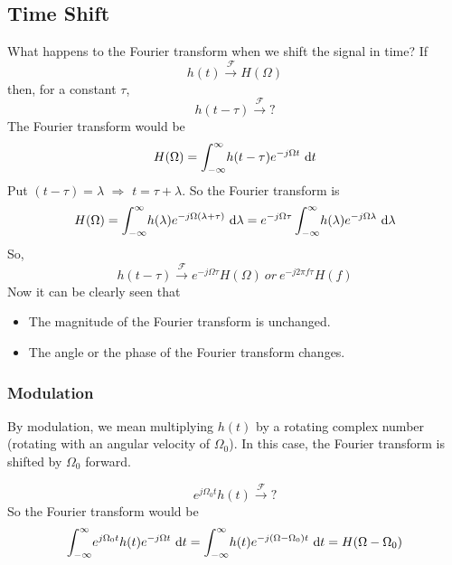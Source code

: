 \subsection{Time Shift}
	What happens to the Fourier transform when we shift the signal in time? If
	\begin{equation}
		h(t) \xrightarrow{\mathcal{F}} H(\Omega)
	\end{equation}
	then, for a constant $\tau$,
	\begin{equation}
		h(t-\tau) \xrightarrow{\mathcal{F}} {?}
	\end{equation}
	The Fourier transform would be
	\begin{equation}
		H(\Omega) =  \int_{-\infty}^{\infty} \! h(t-\tau) e^{-j\Omega t} \ \mathrm{d} t
	\end{equation}
	Put $(t-\tau) = \lambda$  $\Rightarrow$  $t = \tau + \lambda$.
	So the Fourier transform is
	\begin{equation}
		H(\Omega) =  \int_{-\infty}^{\infty} \! h(\lambda) e^{-j\Omega (\lambda + \tau)} \ \dm \lambda =
		e^{-j\Omega \tau} \int_{-\infty}^{\infty} \! h(\lambda) e^{-j\Omega \lambda} \ \dm \lambda
	\end{equation}
	So,
	\begin{equation}
		h(t-\tau) \xrightarrow{\mathcal{F}} e^{-j\Omega \tau} H(\Omega)\   or\   e^{-j2\pi f\tau} H(f)
	\end{equation}
	Now it can be clearly seen that
	\begin{itemize}
		\item The magnitude of the Fourier transform is unchanged.
		\item The angle or the phase of the Fourier transform changes.
	\end{itemize}

	\subsubsection{Modulation}
		By modulation, we mean multiplying $h(t)$ by a rotating complex number (rotating with an angular velocity of $\Omega_0$). In this case, the Fourier transform is shifted by $\Omega_0$ forward.

		\begin{equation}
			e^{j\Omega_0 t} h(t) \xrightarrow{\mathcal{F}} {?}
		\end{equation}
		So the Fourier transform would be
		\begin{equation}
			 \int_{-\infty}^{\infty} \! e^{j\Omega_0 t} h(t) e^{-j\Omega t} \ \dm t =
			 \int_{-\infty}^{\infty} \! h(t) e^{-j(\Omega-\Omega_0) t} \ \dm t =
			 H(\Omega-\Omega_0)
		\end{equation}
		
